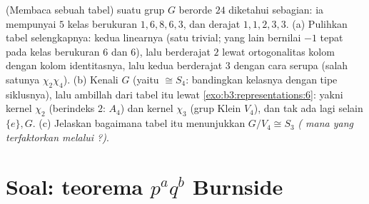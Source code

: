 \begin{exercise}[$\star\star$]\label{exo:b3:representations:12}
(Membaca sebuah tabel)  suatu grup $G$
berorde $24$ diketahui sebagian: ia mempunyai $5$ kelas berukuran
$1, 6, 8, 6, 3$, dan derajat $1, 1, 2, 3, 3$.
(a) Pulihkan tabel selengkapnya: kedua  linearnya
(satu trivial; yang lain bernilai $-1$ tepat pada
kelas berukuran $6$ dan $6$), lalu  berderajat $2$
lewat ortogonalitas kolom dengan kolom identitasnya, lalu
kedua  berderajat $3$ dengan cara serupa (salah satunya $\chi_2\chi_4$).
(b) Kenali $G$ (yaitu $\cong S_4$: bandingkan kelasnya dengan tipe
siklusnya), lalu ambillah dari tabel itu  lewat
\cref{exo:b3:representations:6}: yakni kernel $\chi_2$ (berindeks
$2$: $A_4$) dan kernel $\chi_3$ (grup Klein $V_4$), dan tak ada
lagi selain $\{e\}, G$.
(c) Jelaskan bagaimana tabel itu menunjukkan $G/V_4 \cong S_3$
\emph{( mana yang terfaktorkan melalui ?)}.
\end{exercise}

\section{Soal: teorema \texorpdfstring{$p^aq^b$}{paqb}
Burnside}


